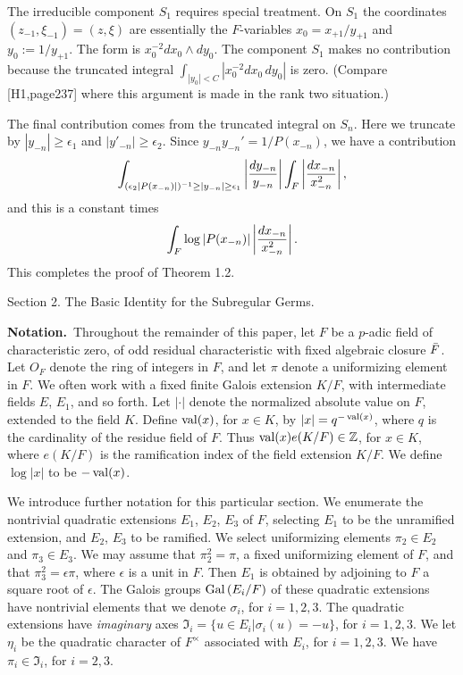 The irreducible component $S_1$ requires special treatment.
On $S_1$ the coordinates $(z_{-1},\xi_{-1}) = (z,\xi)$
are essentially the $F$-variables $x_0 = x_{+1}/y_{+1}$
and $y_0 := 1/y_{+1}$.  The form is $x_0^{-2} dx_0\wedge dy_0$.
The component $S_1$ makes no contribution because the truncated
integral $\int_{|y_0|< C} |x_0^{-2} dx_0\,dy_0|$ is zero.
(Compare [H1,page237] where this argument is made in the
rank two situation.)

The final contribution comes from the truncated integral on $S_n$.
Here we truncate by $|y_{-n}|\ge \epsilon_1$ and $|y'_{-n}|\ge \epsilon_2$.
Since $y_{-n}y_{-n}' = 1/P(x_{-n})$, we have a contribution
$$
\int_{(\epsilon_2 |P(x_{-n})|)^{-1} \ge |y_{-n}|\ge \epsilon_1}
\left| {dy_{-n}\over y_{-n}} \right |
\int_F \left|{dx_{-n}\over x_{-n}^2}\right |,$$
and this is a constant times
$$\int_F \log|P(x_{-n})| \left|{dx_{-n}\over x_{-n}^2}\right|.$$
This completes the proof of Theorem 1.2. \hfill \x


\vfill\break
\centerline{\headfont Section 2.  The Basic Identity for the Subregular Germs.}
\bigskip

\noindent
{\bf Notation.}\  
Throughout the remainder of this paper,
let $F$ be a $p$-adic field of characteristic
zero, of odd residual characteristic with fixed
algebraic closure ${\bar F}$.  Let $O_F$
denote the ring of integers in $F$, and let $\pi$ denote
a uniformizing element in $F$.
We often work with
a fixed finite Galois extension $K/F$, with intermediate
fields $E$, $E_1$, and so forth. 
Let $|\cdot|$ denote
the normalized absolute value on $F$, extended to the
field $K$.  Define $\operatorname{val}(x)$, for $x\in K$, by $|x| = q^{-\operatorname{val}(x)}$,
where $q$ is the cardinality of the residue field of $F$.  
Thus $\operatorname{val}(x) e(K/F) \in {\Bbb Z}$, for $x\in K$, 
where $e(K/F)$ is the
ramification index of the field extension $K/F$.  We define
$\log|x|$ to be $-\operatorname{val}(x)$.

We introduce further notation for this particular section.
We enumerate the
nontrivial quadratic extensions $E_1$, $E_2$, $E_3$ of $F$,
selecting $E_1$ to be the unramified extension, and $E_2$, $E_3$
to be ramified.  We select uniformizing elements $\pi_2\in E_2$
and $\pi_3\in E_3$.  We may assume that $\pi_2^2 = \pi$, a fixed
uniformizing element of $F$, and that $\pi_3^2 = \epsilon\pi$,
where $\epsilon$ is a unit in $F$.  Then $E_1$ is obtained by
adjoining to $F$ a square root of $\epsilon$.  The Galois
groups $\hbox{Gal\,}(E_i/F)$ of these quadratic extensions have nontrivial
elements that we denote $\sigma_i$, for $i=1,2,3$.  The quadratic
extensions have {\it imaginary} axes $\Im_i = \{u\in E_i| \sigma_i(u) = -u\}$,
for $i=1,2,3$.  We let $\eta_i$ be the 
quadratic character of $F^\times$
associated with $E_i$, for $i=1,2,3$.  We have $\pi_i\in \Im_i$,
for $i=2,3$.


